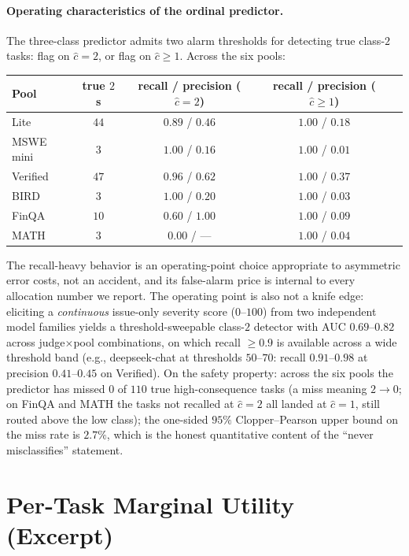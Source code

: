 \documentclass{article}
\begin{document}
\paragraph{Operating characteristics of the ordinal predictor.} The
three-class predictor admits two alarm thresholds for detecting true
class-$2$ tasks: flag on $\hat{c}{=}2$, or flag on
$\hat{c}{\ge}1$. Across the six pools:

\begin{center}
\small
\begin{tabular}{lcccc}
\toprule
Pool & true $2$s & recall / precision ($\hat{c}{=}2$) & recall / precision ($\hat{c}{\ge}1$) \\
\midrule
Lite      & $44$ & $0.89$ / $0.46$ & $1.00$ / $0.18$ \\
MSWE mini & $3$  & $1.00$ / $0.16$ & $1.00$ / $0.01$ \\
Verified  & $47$ & $0.96$ / $0.62$ & $1.00$ / $0.37$ \\
BIRD      & $3$  & $1.00$ / $0.20$ & $1.00$ / $0.03$ \\
FinQA     & $10$ & $0.60$ / $1.00$ & $1.00$ / $0.09$ \\
MATH      & $3$  & $0.00$ / --- & $1.00$ / $0.04$ \\
\bottomrule
\end{tabular}
\end{center}

The recall-heavy behavior is an operating-point choice appropriate to
asymmetric error costs, not an accident, and its false-alarm price is
internal to every allocation number we report. The operating point is
also not a knife edge: eliciting a \emph{continuous} issue-only
severity score ($0$--$100$) from two independent model families yields
a threshold-sweepable class-$2$ detector with AUC $0.69$--$0.82$
across judge$\times$pool combinations, on which recall $\ge 0.9$ is
available across a wide threshold band (e.g., deepseek-chat at
thresholds $50$--$70$: recall $0.91$--$0.98$ at precision
$0.41$--$0.45$ on Verified). On the safety
property: across the six pools the predictor has missed $0$ of
$110$ true high-consequence tasks (a miss meaning $2{\to}0$; on
FinQA and MATH the tasks not recalled at $\hat{c}{=}2$ all landed at
$\hat{c}{=}1$, still routed above the low class); the one-sided
$95\%$ Clopper--Pearson upper bound on the miss rate is $2.7\%$,
which is the honest quantitative content of the ``never
misclassifies'' statement.

\section{Per-Task Marginal Utility (Excerpt)}
\label{app:marginal}
\end{document}
